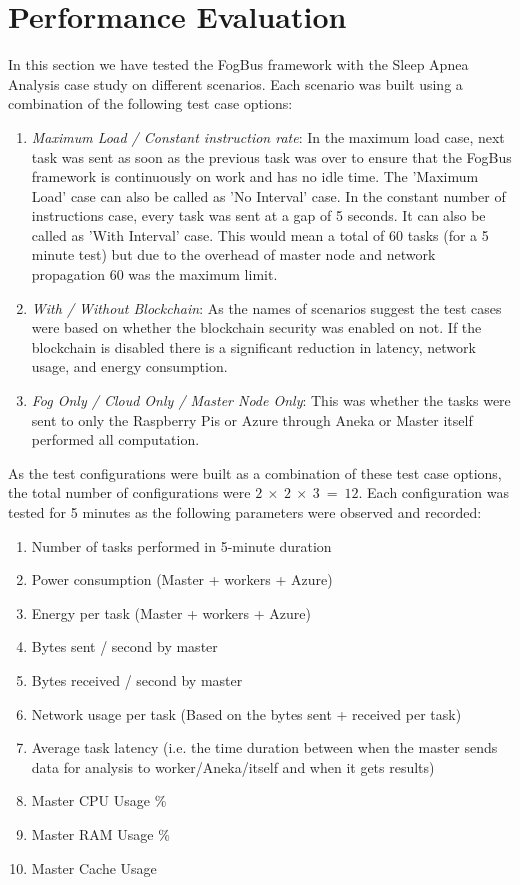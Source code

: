 \documentclass[10pt,journal,compsoc]{IEEEtran}
\begin{document}
\section{Performance Evaluation}

In this section we have tested the FogBus framework with the Sleep Apnea Analysis case study on different scenarios. Each scenario was built using a combination of the following test case options:
\begin{enumerate}
\item \textit{Maximum Load / Constant instruction rate}:  In the maximum load case, next task was sent as soon as the previous task was over to ensure that the FogBus framework is continuously on work and has no idle time. The 'Maximum Load' case can also be called as 'No Interval' case. In the constant number of instructions case, every task was sent at a gap of 5 seconds. It can also be called as 'With Interval' case. This would mean a total of 60 tasks (for a 5 minute test) but due to the overhead of master node and network propagation 60 was the maximum limit.
\item  \textit{With / Without Blockchain}: As the names of scenarios suggest the test cases were based on whether the blockchain security was enabled on not. If the blockchain is disabled there is a significant reduction in latency, network usage, and energy consumption.
\item \textit{Fog Only / Cloud Only / Master Node Only}: This was whether the tasks were sent to only the Raspberry Pis or Azure through Aneka or Master itself performed all computation.
\end{enumerate}
As the test configurations were built as a combination of these test case options, the total number of configurations were $2 \  \times \ 2 \ \times \  3 \ =\  12$. Each configuration was tested for 5 minutes as the following parameters were observed and recorded:
\begin{enumerate}
\item Number of tasks performed in 5-minute duration
\item Power consumption (Master + workers + Azure)
\item Energy per task (Master + workers + Azure)
\item Bytes sent / second by master
\item Bytes received / second by master
\item Network usage per task (Based on the bytes sent + received per task)
\item Average task latency (i.e. the time duration between when the master sends data for analysis to worker/Aneka/itself and when it gets results)
\item Master CPU Usage \%
\item Master RAM Usage \%
\item Master Cache Usage
\end{enumerate}
\end{document}
